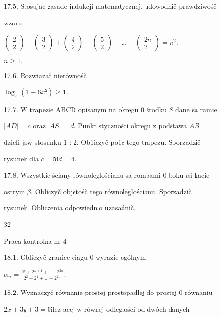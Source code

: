 \documentclass[a4paper,12pt]{article}
\begin{document}
17.5. Stosujac zasade indukcji matematycznej, udowodnič prawdziwośč

wzoru

$\left(\begin{array}{l}
2\\
2
\end{array}\right) - \left(\begin{array}{l}
3\\
2
\end{array}\right)+\left(\begin{array}{l}
4\\
2
\end{array}\right) - \left(\begin{array}{l}
5\\
2
\end{array}\right)+\ldots+\left(\begin{array}{l}
2n\\
2
\end{array}\right) =n^{2},$

$n\geq 1.$

17.6. Rozwiazač nierównośč

$\log_{x}(1-6x^{2})\geq 1.$

17.7. $\mathrm{W}$ trapezie ABCD opisanym na okregu $0$ środku $S$ dane sa ramie

$|AD| =c$ oraz $|AS| =d$. Punkt styczności okregu $\mathrm{z}$ podstawa $AB$

dzieli $\mathrm{j}\mathrm{a}\mathrm{w}$ stosunku 1 : 2. Ob1iczyč po1e tego trapezu. Sporzadzič

rysunek dla $c=5\mathrm{i}d=4.$

17.8. Wszystkie ściany równoleglościanu sa rombami $0$ boku $\alpha \mathrm{i}$ kacie

ostrym $\beta$. Obliczyč objetośč tego równoleglościanu. Sporzadzič

rysunek. Obliczenia odpowiednio uzasadnič.





32

Praca kontrolna nr 4

18.1. Obliczyč granice ciagu 0 wyrazie ogólnym

$\displaystyle \alpha_{n}=\frac{2^{n}+2^{n+1}+..+2^{2n}}{2^{2}+2^{4}+\ldots+2^{2n}}.$

18.2. Wyznaczyč równanie prostej prostopadlej do prostej $0$ równaniu

$2x+3y+3 = 0 \mathrm{i} \mathrm{l}\mathrm{e}\dot{\mathrm{z}}$ acej $\mathrm{w}$ równej odleglości od dwóch danych
\end{document}
